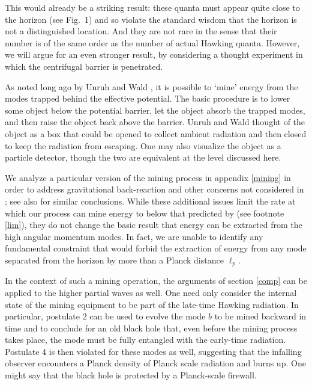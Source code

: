 \documentclass[12pt]{article}
\begin{document}
This would already be a striking result: these quanta must appear quite close to the horizon (see Fig.~1) and so violate the standard wisdom that the horizon is not a distinguished location.  And they are not rare {in the sense that} their number is of the same order as the number of actual Hawking quanta. However, we will argue for an even stronger result, by considering a thought experiment in which the centrifugal barrier is penetrated.

As
noted long ago by Unruh and Wald \cite{Unruh:1982ic},
it is possible to `mine' energy from the modes trapped behind the effective potential.  The basic procedure is to lower some object below the potential barrier, let the object absorb the trapped modes, and then raise the object back above the barrier.  Unruh and Wald thought of the object as a box that could be opened to collect ambient radiation and then closed to keep the radiation from escaping.  One may also visualize the object as a particle detector, though the two are equivalent at the level discussed here.

We analyze a particular version of the mining process in appendix \ref{mining} in order to address gravitational back-reaction and other concerns not considered in \cite{Unruh:1982ic}; see also \cite{AB} for similar conclusions. While these additional issues limit the rate at which our process can mine energy to below that predicted by \cite{Unruh:1982ic} (see footnote \ref{lim}), they do not change the basic result that energy can be extracted from the high angular momentum modes.  In fact, we are unable to identify any fundamental constraint that would forbid the extraction of energy from any mode separated from the horizon by more than a Planck distance $\ell_p$.

In the context of such a mining operation, the arguments of section \ref{comp} can be applied to the higher partial waves as well.  One need only consider the internal state of the mining equipment to be part of the late-time Hawking radiation.  In particular, postulate 2 can be used to evolve the mode $b$ to be mined backward in time and to conclude for an old black hole that, even before the mining process takes place, the mode must be fully entangled with the early-time radiation.  Postulate 4 is then violated for these modes as well, suggesting that the infalling observer encounters a Planck density of Planck scale radiation and burns up.  One might say that the black hole is protected by a Planck-scale firewall.
\end{document}

